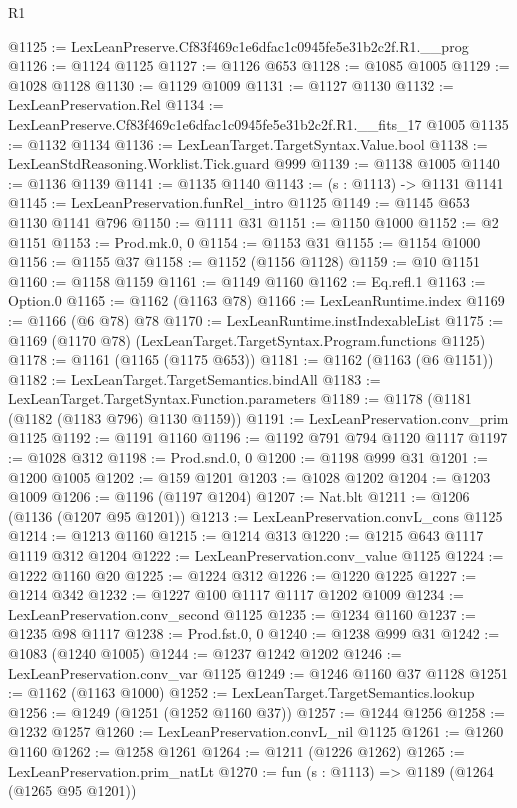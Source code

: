 \begin{lexlean}{R1}
\begin{coremodule}
@1125 := LexLeanPreserve.Cf83f469c1e6dfac1c0945fe5e31b2c2f.R1.__prog
@1126 := @1124 @1125
@1127 := @1126 @653
@1128 := @1085 @1005
@1129 := @1028 @1128
@1130 := @1129 @1009
@1131 := @1127 @1130
@1132 := LexLeanPreservation.Rel
@1134 := LexLeanPreserve.Cf83f469c1e6dfac1c0945fe5e31b2c2f.R1.__fits_17 @1005
@1135 := @1132 @1134
@1136 := LexLeanTarget.TargetSyntax.Value.bool
@1138 := LexLeanStdReasoning.Worklist.Tick.guard @999
@1139 := @1138 @1005
@1140 := @1136 @1139
@1141 := @1135 @1140
@1143 := (s : @1113) -> @1131 @1141
@1145 := LexLeanPreservation.funRel_intro @1125
@1149 := @1145 @653 @1130 @1141 @796
@1150 := @1111 @31
@1151 := @1150 @1000
@1152 := @2 @1151
@1153 := Prod.mk.{0, 0}
@1154 := @1153 @31
@1155 := @1154 @1000
@1156 := @1155 @37
@1158 := @1152 (@1156 @1128)
@1159 := @10 @1151
@1160 := @1158 @1159
@1161 := @1149 @1160
@1162 := Eq.refl.{1}
@1163 := Option.{0}
@1165 := @1162 (@1163 @78)
@1166 := LexLeanRuntime.index
@1169 := @1166 (@6 @78) @78
@1170 := LexLeanRuntime.instIndexableList
@1175 := @1169 (@1170 @78) (LexLeanTarget.TargetSyntax.Program.functions @1125)
@1178 := @1161 (@1165 (@1175 @653))
@1181 := @1162 (@1163 (@6 @1151))
@1182 := LexLeanTarget.TargetSemantics.bindAll
@1183 := LexLeanTarget.TargetSyntax.Function.parameters
@1189 := @1178 (@1181 (@1182 (@1183 @796) @1130 @1159))
@1191 := LexLeanPreservation.conv_prim @1125
@1192 := @1191 @1160
@1196 := @1192 @791 @794 @1120 @1117
@1197 := @1028 @312
@1198 := Prod.snd.{0, 0}
@1200 := @1198 @999 @31
@1201 := @1200 @1005
@1202 := @159 @1201
@1203 := @1028 @1202
@1204 := @1203 @1009
@1206 := @1196 (@1197 @1204)
@1207 := Nat.blt
@1211 := @1206 (@1136 (@1207 @95 @1201))
@1213 := LexLeanPreservation.convL_cons @1125
@1214 := @1213 @1160
@1215 := @1214 @313
@1220 := @1215 @643 @1117 @1119 @312 @1204
@1222 := LexLeanPreservation.conv_value @1125
@1224 := @1222 @1160 @20
@1225 := @1224 @312
@1226 := @1220 @1225
@1227 := @1214 @342
@1232 := @1227 @100 @1117 @1117 @1202 @1009
@1234 := LexLeanPreservation.conv_second @1125
@1235 := @1234 @1160
@1237 := @1235 @98 @1117
@1238 := Prod.fst.{0, 0}
@1240 := @1238 @999 @31
@1242 := @1083 (@1240 @1005)
@1244 := @1237 @1242 @1202
@1246 := LexLeanPreservation.conv_var @1125
@1249 := @1246 @1160 @37 @1128
@1251 := @1162 (@1163 @1000)
@1252 := LexLeanTarget.TargetSemantics.lookup
@1256 := @1249 (@1251 (@1252 @1160 @37))
@1257 := @1244 @1256
@1258 := @1232 @1257
@1260 := LexLeanPreservation.convL_nil @1125
@1261 := @1260 @1160
@1262 := @1258 @1261
@1264 := @1211 (@1226 @1262)
@1265 := LexLeanPreservation.prim_natLt
@1270 := fun (s : @1113) => @1189 (@1264 (@1265 @95 @1201))

\end{coremodule}
\end{lexlean}

